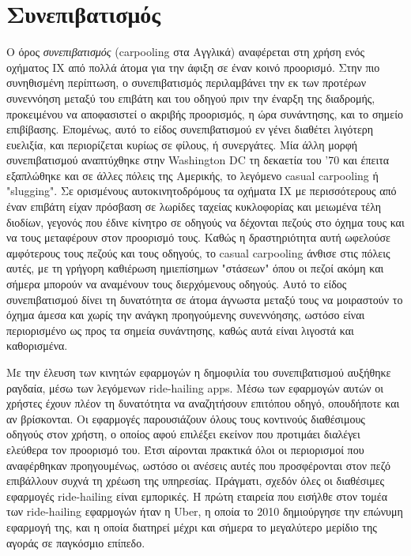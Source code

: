 \documentclass[../thesis.tex]{subfiles}
\begin{document}
\section{Συνεπιβατισμός}
Ο όρος \textit{συνεπιβατισμός} (carpooling στα Αγγλικά) αναφέρεται στη χρήση ενός οχήματος ΙΧ από πολλά άτομα για την άφιξη σε έναν κοινό προορισμό.
Στην πιο συνηθισμένη περίπτωση, ο συνεπιβατισμός περιλαμβάνει την εκ των προτέρων συνεννόηση μεταξύ του επιβάτη και του οδηγού πριν την έναρξη της διαδρομής, προκειμένου να αποφασιστεί ο ακριβής προορισμός, η ώρα συνάντησης, και το σημείο επιβίβασης.
Επομένως, αυτό το είδος συνεπιβατισμού εν γένει διαθέτει λιγότερη ευελιξία, και περιορίζεται κυρίως σε φίλους, ή συνεργάτες.
Μία άλλη μορφή συνεπιβατισμού αναπτύχθηκε στην Washington DC τη δεκαετία του '70 και έπειτα εξαπλώθηκε και σε άλλες πόλεις της Αμερικής, το λεγόμενο casual carpooling ή "slugging".
Σε ορισμένους αυτοκινητοδρόμους τα οχήματα ΙΧ με περισσότερους από έναν επιβάτη είχαν πρόσβαση σε λωρίδες ταχείας κυκλοφορίας και μειωμένα τέλη διοδίων, γεγονός που έδινε κίνητρο σε οδηγούς να δέχονται πεζούς στο όχημα τους και να τους μεταφέρουν στον προορισμό τους.
Καθώς η δραστηριότητα αυτή ωφελούσε αμφότερους τους πεζούς και τους οδηγούς, το casual carpooling άνθισε στις πόλεις αυτές, με τη γρήγορη καθιέρωση ημιεπίσημων "στάσεων" όπου οι πεζοί ακόμη και σήμερα μπορούν να αναμένουν τους διερχόμενους οδηγούς.
Αυτό το είδος συνεπιβατισμού δίνει τη δυνατότητα σε άτομα άγνωστα μεταξύ τους να μοιραστούν το όχημα άμεσα και χωρίς την ανάγκη προηγούμενης συνεννόησης, ωστόσο είναι περιορισμένο ως προς τα σημεία συνάντησης, καθώς αυτά είναι λιγοστά και καθορισμένα.

Με την έλευση των κινητών εφαρμογών η δημοφιλία του συνεπιβατισμού αυξήθηκε ραγδαία, μέσω των λεγόμενων ride-hailing apps.
Μέσω των εφαρμογών αυτών οι χρήστες έχουν πλέον τη δυνατότητα να αναζητήσουν επιτόπου οδηγό, οπουδήποτε και αν βρίσκονται.
Οι εφαρμογές παρουσιάζουν όλους τους κοντινούς διαθέσιμους οδηγούς στον χρήστη, ο οποίος αφού επιλέξει εκείνον που προτιμάει διαλέγει ελεύθερα τον προορισμό του.
Έτσι αίρονται πρακτικά όλοι οι περιορισμοί που αναφέρθηκαν προηγουμένως, ωστόσο οι ανέσεις αυτές που προσφέρονται στον πεζό επιβάλλουν συχνά τη χρέωση της υπηρεσίας.
Πράγματι, σχεδόν όλες οι διαθέσιμες εφαρμογές ride-hailing είναι εμπορικές.
Η πρώτη εταιρεία που εισήλθε στον τομέα των ride-hailing εφαρμογών ήταν η Uber, η οποία το 2010 δημιούργησε την επώνυμη εφαρμογή της, και η οποία διατηρεί μέχρι και σήμερα το μεγαλύτερο μερίδιο της αγοράς σε παγκόσμιο επίπεδο.
\end{document}
